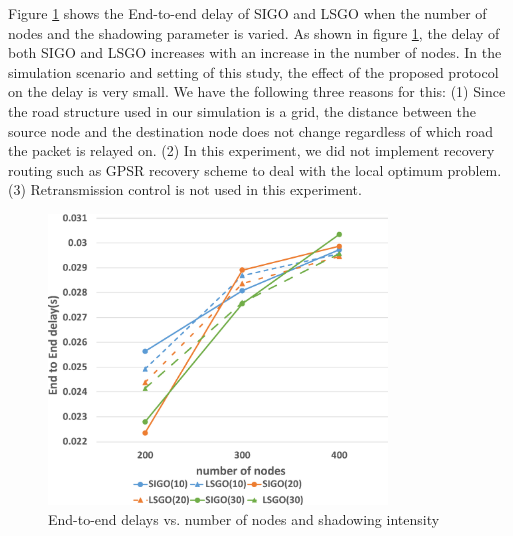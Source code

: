 \documentclass[conference]{IEEEtran}
\begin{document}
Figure \ref{fig:delay} shows the End-to-end delay of SIGO and LSGO when the number of nodes and the shadowing parameter is varied. 
As shown in figure \ref{fig:delay}, the delay of both SIGO and LSGO increases with an increase in the number of nodes. In the simulation scenario and setting of this study, the effect of the proposed protocol on the delay is very small. 
We have the following three reasons for this: 
(1) Since the road structure used in our simulation is a grid, the distance between the source node and the destination node does not change regardless of which road the packet is relayed on.
(2) In this experiment, we did not implement recovery routing such as GPSR recovery scheme to deal with the local optimum problem. (3) Retransmission control is not used in this experiment.







\begin{figure}[!ht]
\centering
\includegraphics[width=90mm]{figures/delay.eps}
\caption{End-to-end delays vs. number of nodes and shadowing intensity }
\label{fig:delay}
\end{figure}
\end{document}

